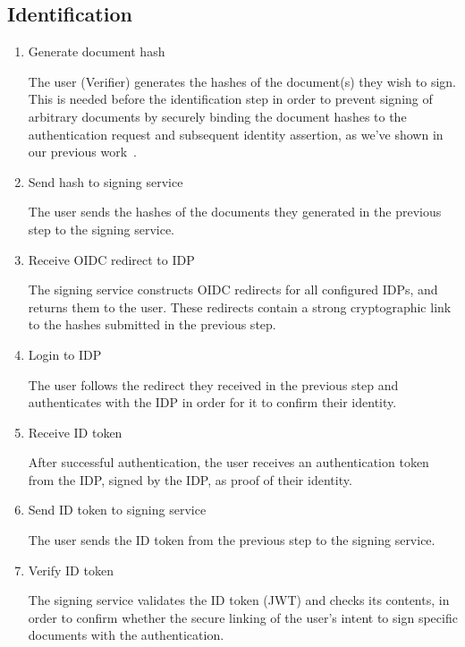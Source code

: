 \subsection{Identification}\label{subsec:identification}
\begin{enumerate}[resume]
    \item Generate document hash

    The user (Verifier) generates the hashes of the document(s) they wish to sign.
    This is needed before the identification step in order to prevent signing of arbitrary documents by securely binding the document hashes to the authentication request and subsequent identity assertion,
    as we've shown in our previous work~\cite{projekt2}.

    \item Send hash to signing service

    The user sends the hashes of the documents they generated in the previous step to the signing service.

    \item Receive \gls{OIDC} redirect to \gls{IDP}

    The signing service constructs \gls{OIDC} redirects for all configured \gls{IDP}s,
    and returns them to the user.
    These redirects contain a strong cryptographic link to the hashes submitted in the previous step.

    \item Login to \gls{IDP}

    The user follows the redirect they received in the previous step and authenticates with the \gls{IDP} in order for it to confirm their identity.

    \item Receive ID token

    After successful authentication, the user receives an authentication token from the \gls{IDP},
    signed by the \gls{IDP}, as proof of their identity.

    \item Send ID token to signing service

    The user sends the ID token from the previous step to the signing service.

    \item Verify ID token

    The signing service validates the ID token (\gls{JWT}) and checks its contents,
    in order to confirm whether the secure linking of the user's intent to sign specific documents with the authentication.
\end{enumerate}


